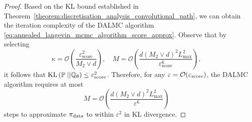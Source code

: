 \begin{proof}
Based on the \gls*{KL} bound established in Theorem~\ref{theorem:discretisation_analysis_convolutional_path}, we can obtain the iteration complexity of the \gls*{DALMC} algorithm \eqref{eq:annealed_langevin_mcmc_algorithm_score_approx}. Observe that by selecting 
\begin{equation*}
    \kappa = \mathcal{O}\left(\frac{\varepsilon_{\text{score}}^2}{M_2\vee d}\right),\quad M = \mathcal{O}\left(\frac{d(M_2\vee d)^2L_{\max}^2}{\varepsilon_{\text{score}}^6}\right),
\end{equation*}
it follows that $\operatorname*{KL}\left(\mathbb{P}\;||\mathbb{Q}_\theta\right)\leq \varepsilon_{\text{score}}^2$. Therefore, for any $\varepsilon = \mathcal{O}(\varepsilon_{\operatorname*{\text{score}}})$, the \gls*{DALMC} algorithm requires at most 
\begin{equation*}
     M = \mathcal{O}\left(\frac{d (M_2 \vee d)^2 L_{\max}^2}{\varepsilon^6}\right)
\end{equation*}
steps to approximate $\operatorname*{\pi_{\text{data}}}$ to within $\varepsilon^2$ in \gls*{KL} divergence.
\end{proof}